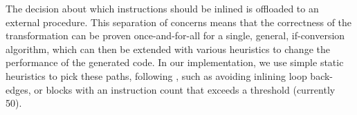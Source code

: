 \noindent
The decision about which  instructions should be inlined is offloaded to an external procedure.
This separation of concerns means that the correctness of the transformation can be proven once-and-for-all for a single, general,
if-conversion algorithm, which can then be extended with various heuristics to change the performance of the generated code.
In our implementation, we use simple static heuristics to pick
these paths, following \textcite{ball93_branc_predic_free}, such as avoiding inlining loop back-edges, or blocks with an instruction count that exceeds a threshold (currently 50). %






%

